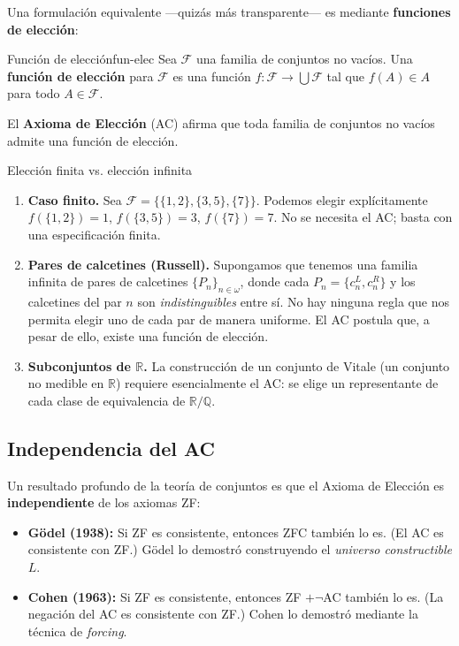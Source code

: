 Una formulación equivalente —quizás más transparente— es mediante \textbf{funciones de elección}:

\begin{definicion}{Función de elección}{fun-elec}
Sea $\mathcal{F}$ una familia de conjuntos no vacíos. Una \textbf{función de elección} para $\mathcal{F}$ es una función $f: \mathcal{F} \to \bigcup \mathcal{F}$ tal que $f(A) \in A$ para todo $A \in \mathcal{F}$.

\medskip
El \textbf{Axioma de Elección} (AC) afirma que toda familia de conjuntos no vacíos admite una función de elección.
\end{definicion}

\begin{ejemplo}{Elección finita vs. elección infinita}{}
\begin{enumerate}[leftmargin=2em, label=(\alph*)]
  \item \textbf{Caso finito.} Sea $\mathcal{F} = \{\{1,2\},\{3,5\},\{7\}\}$. Podemos elegir explícitamente $f(\{1,2\}) = 1$, $f(\{3,5\}) = 3$, $f(\{7\}) = 7$. No se necesita el AC; basta con una especificación finita.

  \item \textbf{Pares de calcetines (Russell).} Supongamos que tenemos una familia infinita de pares de calcetines $\{P_n\}_{n \in \omega}$, donde cada $P_n = \{c_n^L, c_n^R\}$ y los calcetines del par $n$ son \emph{indistinguibles} entre sí. No hay ninguna regla que nos permita elegir uno de cada par de manera uniforme. El AC postula que, a pesar de ello, existe una función de elección.

  \item \textbf{Subconjuntos de $\mathbb{R}$.} La construcción de un conjunto de Vitale (un conjunto no medible en $\mathbb{R}$) requiere esencialmente el AC: se elige un representante de cada clase de equivalencia de $\mathbb{R}/\mathbb{Q}$.
\end{enumerate}
\end{ejemplo}

\subsection{Independencia del AC}

Un resultado profundo de la teoría de conjuntos es que el Axioma de Elección es \textbf{independiente} de los axiomas ZF:
\begin{itemize}[leftmargin=2em]
  \item \textbf{Gödel (1938):} Si ZF es consistente, entonces ZFC también lo es. (El AC es consistente con ZF.) Gödel lo demostró construyendo el \textit{universo constructible} $L$.
  \item \textbf{Cohen (1963):} Si ZF es consistente, entonces ZF $+ \neg$AC también lo es. (La negación del AC es consistente con ZF.) Cohen lo demostró mediante la técnica de \textit{forcing}.
\end{itemize}

